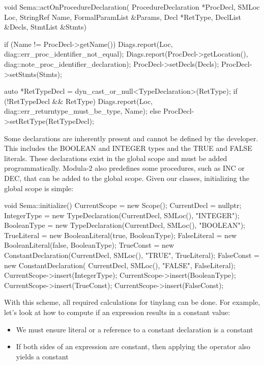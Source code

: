 \begin{cpp}
void Sema::actOnProcedureDeclaration(
        ProcedureDeclaration *ProcDecl, SMLoc Loc,
        StringRef Name, FormalParamList &Params, Decl *RetType,
        DeclList &Decls, StmtList &Stmts) {

    if (Name != ProcDecl->getName()) {
        Diags.report(Loc, diag::err_proc_identifier_not_equal);
        Diags.report(ProcDecl->getLocation(),
                     diag::note_proc_identifier_declaration);
    }
    ProcDecl->setDecls(Decls);
    ProcDecl->setStmts(Stmts);

    auto *RetTypeDecl =
    dyn_cast_or_null<TypeDeclaration>(RetType);
    if (!RetTypeDecl && RetType)
        Diags.report(Loc, diag::err_returntype_must_be_type, Name);
    else
        ProcDecl->setRetType(RetTypeDecl);
}
\end{cpp}

Some declarations are inherently present and cannot be defined by the developer. This includes the BOOLEAN and INTEGER types and the TRUE and FALSE literals. These declarations exist in the global scope and must be added programmatically. Modula-2 also predefines some procedures, such as INC or DEC, that can be added to the global scope. Given our classes, initializing the global scope is simple:

\begin{cpp}
void Sema::initialize() {
    CurrentScope = new Scope();
    CurrentDecl = nullptr;
    IntegerType =
        new TypeDeclaration(CurrentDecl, SMLoc(), "INTEGER");
    BooleanType =
        new TypeDeclaration(CurrentDecl, SMLoc(), "BOOLEAN");
    TrueLiteral = new BooleanLiteral(true, BooleanType);
    FalseLiteral = new BooleanLiteral(false, BooleanType);
    TrueConst = new ConstantDeclaration(CurrentDecl, SMLoc(),
                                        "TRUE", TrueLiteral);
    FalseConst = new ConstantDeclaration(
        CurrentDecl, SMLoc(), "FALSE", FalseLiteral);
    CurrentScope->insert(IntegerType);
    CurrentScope->insert(BooleanType);
    CurrentScope->insert(TrueConst);
    CurrentScope->insert(FalseConst);
}
\end{cpp}

With this scheme, all required calculations for tinylang can be done. For example, let’s look at how to compute if an expression results in a constant value:

\begin{itemize}
\item
We must ensure literal or a reference to a constant declaration is a constant

\item
If both sides of an expression are constant, then applying the operator also yields a constant
\end{itemize}

